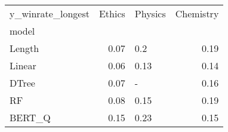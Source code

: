 \begin{tabular}{lrlr}
\toprule
y\_winrate\_longest &  Ethics & Physics &  Chemistry \\
model  &         &         &            \\
\midrule
Length &    0.07 &     0.2 &       0.19 \\
Linear &    0.06 &    0.13 &       0.14 \\
DTree  &    0.07 &       - &       0.16 \\
RF     &    0.08 &    0.15 &       0.19 \\
BERT\_Q &    0.15 &    0.23 &       0.15 \\
\bottomrule
\end{tabular}
